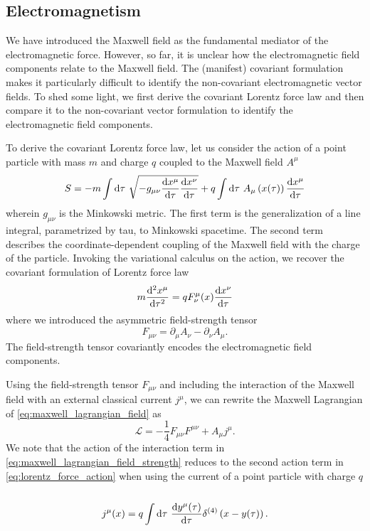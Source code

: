 \subsection{Electromagnetism}

We have introduced the Maxwell field as the fundamental mediator of the electromagnetic force.
However, so far, it is unclear how the electromagnetic field components relate to the Maxwell field.
The (manifest) covariant formulation makes it particularly difficult to identify the non-covariant electromagnetic vector fields.
To shed some light, we first derive the covariant Lorentz force law and then compare it to the non-covariant vector formulation to identify the electromagnetic field components.

To derive the covariant Lorentz force law, let us consider the action of a point particle with mass $m$ and charge $q$ coupled to the Maxwell field $A^\mu$~\cite[p.~244]{Zee2013}
\begin{equation}
	S
	=
	-
	m\int\dd{\tau}
	\sqrt{-g_{\mu\nu}\odv{x^\mu}{\tau}\odv{x^\nu}{\tau}}
	+
	q\int\dd{\tau}
	A_\mu\left(x(\tau)\right)
	\odv{x^\mu}{\tau}
	\label{eq:lorentz_force_action}
\end{equation}
wherein $g_{\mu\nu}$ is the Minkowski metric.
The first term is the generalization of a line integral, parametrized by tau, to Minkowski spacetime.
The second term describes the coordinate-dependent coupling of the Maxwell field with the charge of the particle.
Invoking the variational calculus on the action, we recover the covariant formulation of Lorentz force law
\begin{equation}
	m
	\odv[order={2}]{x^\mu}{\tau}
	=
	qF^\mu_\nu(x)\odv{x^\nu}{\tau}
	\label{eq:covariant_lorentz_force}
\end{equation}
where we introduced the asymmetric field-strength tensor
\begin{equation}
	F_{\mu\nu}
	=
	\partial_\mu
	A_\nu
	-
	\partial_\nu
	A_\mu
	\label{eq:field_strength_tensor}
	.
\end{equation}
The field-strength tensor covariantly encodes the electromagnetic field components.

Using the field-strength tensor $F_{\mu\nu}$ and including the interaction of the Maxwell field with an external classical current $j^\mu$, we can rewrite the Maxwell Lagrangian of \cref{eq:maxwell_lagrangian_field} as
\begin{equation}
	\mathcal{L}
	=
	-
	\frac{1}{4}
	F_{\mu\nu}
	F^{\mu\nu}
	+
	A_\mu j^\mu
	\label{eq:maxwell_lagrangian_field_strength}
	.
\end{equation}
We note that the action of the interaction term in \cref{eq:maxwell_lagrangian_field_strength} reduces to the second action term in \cref{eq:lorentz_force_action} when using the current of a point particle with charge $q$~\cite[p.~177]{Peskin1995}
\begin{equation}
	j^\mu(x)
	=
	q
	\int\dd{\tau}
	\odv{y^\mu(\tau)}{\tau}
	\delta^{(4)}\left(x-y(\tau)\right)
	.
\end{equation}

